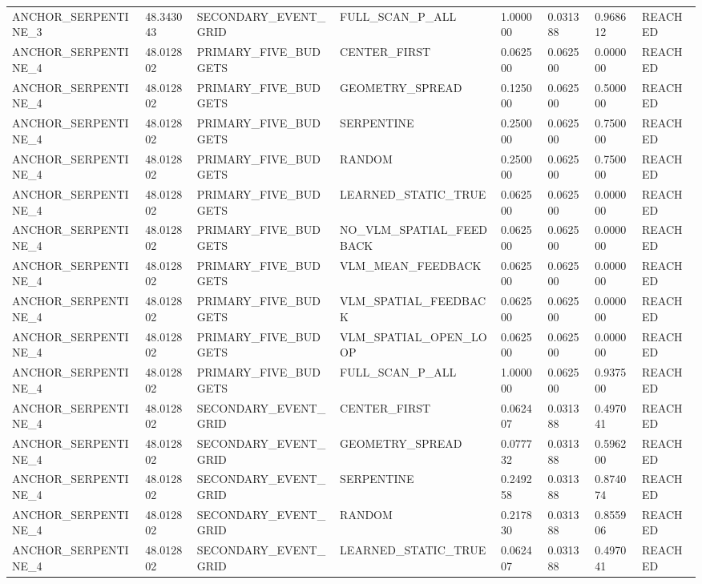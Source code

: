 \begin{tabular}{llllllll}
ANCHOR\_SERPENTINE\_3 & 48.343043 & SECONDARY\_EVENT\_GRID & FULL\_SCAN\_P\_ALL & 1.000000 & 0.031388 & 0.968612 & REACHED \\
ANCHOR\_SERPENTINE\_4 & 48.012802 & PRIMARY\_FIVE\_BUDGETS & CENTER\_FIRST & 0.062500 & 0.062500 & 0.000000 & REACHED \\
ANCHOR\_SERPENTINE\_4 & 48.012802 & PRIMARY\_FIVE\_BUDGETS & GEOMETRY\_SPREAD & 0.125000 & 0.062500 & 0.500000 & REACHED \\
ANCHOR\_SERPENTINE\_4 & 48.012802 & PRIMARY\_FIVE\_BUDGETS & SERPENTINE & 0.250000 & 0.062500 & 0.750000 & REACHED \\
ANCHOR\_SERPENTINE\_4 & 48.012802 & PRIMARY\_FIVE\_BUDGETS & RANDOM & 0.250000 & 0.062500 & 0.750000 & REACHED \\
ANCHOR\_SERPENTINE\_4 & 48.012802 & PRIMARY\_FIVE\_BUDGETS & LEARNED\_STATIC\_TRUE & 0.062500 & 0.062500 & 0.000000 & REACHED \\
ANCHOR\_SERPENTINE\_4 & 48.012802 & PRIMARY\_FIVE\_BUDGETS & NO\_VLM\_SPATIAL\_FEEDBACK & 0.062500 & 0.062500 & 0.000000 & REACHED \\
ANCHOR\_SERPENTINE\_4 & 48.012802 & PRIMARY\_FIVE\_BUDGETS & VLM\_MEAN\_FEEDBACK & 0.062500 & 0.062500 & 0.000000 & REACHED \\
ANCHOR\_SERPENTINE\_4 & 48.012802 & PRIMARY\_FIVE\_BUDGETS & VLM\_SPATIAL\_FEEDBACK & 0.062500 & 0.062500 & 0.000000 & REACHED \\
ANCHOR\_SERPENTINE\_4 & 48.012802 & PRIMARY\_FIVE\_BUDGETS & VLM\_SPATIAL\_OPEN\_LOOP & 0.062500 & 0.062500 & 0.000000 & REACHED \\
ANCHOR\_SERPENTINE\_4 & 48.012802 & PRIMARY\_FIVE\_BUDGETS & FULL\_SCAN\_P\_ALL & 1.000000 & 0.062500 & 0.937500 & REACHED \\
ANCHOR\_SERPENTINE\_4 & 48.012802 & SECONDARY\_EVENT\_GRID & CENTER\_FIRST & 0.062407 & 0.031388 & 0.497041 & REACHED \\
ANCHOR\_SERPENTINE\_4 & 48.012802 & SECONDARY\_EVENT\_GRID & GEOMETRY\_SPREAD & 0.077732 & 0.031388 & 0.596200 & REACHED \\
ANCHOR\_SERPENTINE\_4 & 48.012802 & SECONDARY\_EVENT\_GRID & SERPENTINE & 0.249258 & 0.031388 & 0.874074 & REACHED \\
ANCHOR\_SERPENTINE\_4 & 48.012802 & SECONDARY\_EVENT\_GRID & RANDOM & 0.217830 & 0.031388 & 0.855906 & REACHED \\
ANCHOR\_SERPENTINE\_4 & 48.012802 & SECONDARY\_EVENT\_GRID & LEARNED\_STATIC\_TRUE & 0.062407 & 0.031388 & 0.497041 & REACHED \\

\end{tabular}
